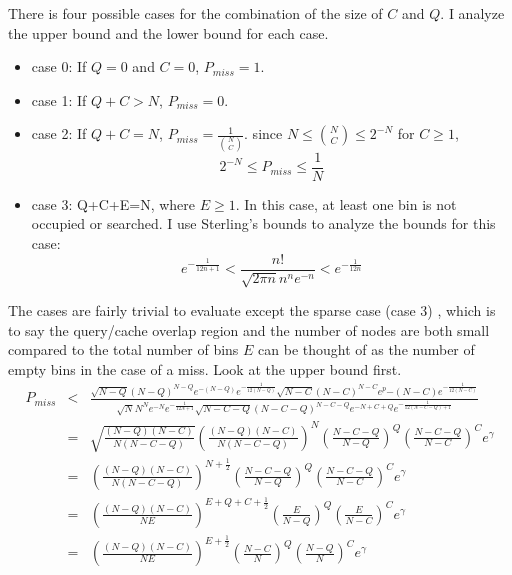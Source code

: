 \documentclass[9.5pt,journal,final,finalsubmission,twocolumn]{IEEEtran}
\begin{document}
There is four possible cases for the combination of the size of $C$ and $Q$. 
I analyze the upper bound and the lower bound for each case. 
\begin{itemize}
\item case 0: If $Q=0$ and $C=0$, $P_{miss}=1$.
\item case 1: If $Q+C>N$, $P_{miss}=0$.
\item case 2: If $Q+C=N$, $P_{miss}=\frac{1}{{{N}\choose{C}}}$. 
since $N \leq {{N}\choose{C}} \leq 2^{-N}$ for $C\geq 1$,  
\begin{equation}
2^{-N} \leq P_{miss} \leq \frac{1}{N}
\end{equation}
\item case 3: Q+C+E=N, where $E\geq1$. In this case, at least one bin is not 
occupied or searched.
I use Sterling's bounds to analyze the bounds for this case:
\begin{equation}
e^{-\frac{1}{12n+1}} < \frac{n!}{\sqrt{2\pi n}n^n e^{-n}} < e^{-\frac{1}{12n}}
\end{equation}
\end{itemize}
The cases are fairly trivial to evaluate except the sparse case (case 3)
, which is to say the query/cache overlap region and the number
of nodes are both small compared to the total number of bins
$E$ can be thought of as the number of empty bins in the case of a miss.
Look at the upper bound first.
\begin{eqnarray*}
P_{miss} &<& \frac{\sqrt{N-Q}(N-Q)^{N-Q} e^{-(N-Q)} e^{-\frac{1}{12(N-Q)}} \sqrt{N-C}(N-C)^{N-C} e^p{-(N-C)} e^{-\frac{1}{12(N-C)}}} {\sqrt{N}N^N e^{-N} e^{-\frac{1}{12N+1}} \sqrt{N-C-Q}(N-C-Q)^{N-C-Q} e^{-N+C+Q} e^{-\frac{1}{12(N-C-Q)+1}}}\\
         &=& \sqrt{\frac{(N-Q)(N-C)}{N(N-C-Q)}} \left(\frac{(N-Q)(N-C)}{N(N-C-Q)}\right)^{N} \left(\frac{N-C-Q}{N-Q}\right)^{Q} \left(\frac{N-C-Q}{N-C}\right)^{C} e^{\gamma}\\
         &=& \left(\frac{(N-Q)(N-C)}{N(N-C-Q)}\right)^{N+\frac{1}{2}} \left(\frac{N-C-Q}{N-Q}\right)^{Q} \left(\frac{N-C-Q}{N-C}\right)^{C} e^{\gamma}\\
         &=& \left(\frac{(N-Q)(N-C)}{NE}\right)^{E+Q+C+\frac{1}{2}} \left(\frac{E}{N-Q}\right)^{Q} \left(\frac{E}{N-C}\right)^{C} e^{\gamma}\\
         &=& \left(\frac{(N-Q)(N-C)}{NE}\right)^{E+\frac{1}{2}} \left(\frac{N-C}{N}\right)^{Q} \left(\frac{N-Q}{N}\right)^{C} e^{\gamma}\\
\end{eqnarray*}
\end{document}
